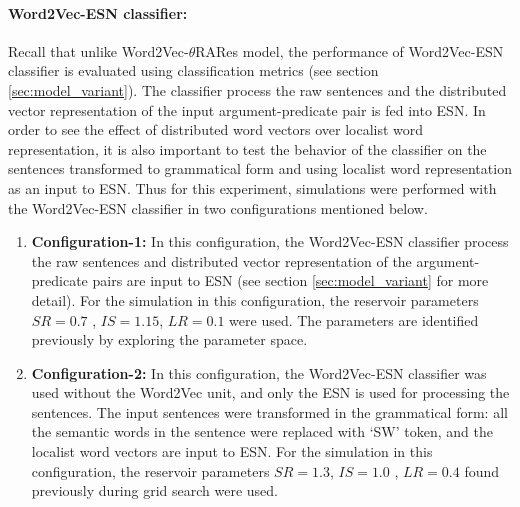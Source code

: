 \paragraph{Word2Vec-ESN classifier:} 

Recall that unlike Word2Vec-$\theta$RARes model, the performance of Word2Vec-ESN classifier is evaluated using classification metrics (see section \ref{sec:model_variant}). The classifier process the raw sentences and the distributed vector representation of the input argument-predicate pair is fed into ESN. In order to see the effect of distributed word vectors over localist word representation, it is also important to test the behavior of the classifier on the sentences transformed to grammatical form and using localist word representation as an input to ESN. Thus for this experiment, simulations were performed with the Word2Vec-ESN classifier in two configurations mentioned below.

\begin{enumerate}
\setlength{\itemsep}{\smallskipamount}

\item \textbf{Configuration-1: } In this configuration, the Word2Vec-ESN classifier process the raw sentences and distributed vector representation of the argument-predicate pairs are input to ESN (see section \ref{sec:model_variant} for more detail). For the simulation in this configuration, the reservoir parameters $SR = 0.7$ , $IS = 1.15$, $LR = 0.1$ were used. The parameters are identified previously by exploring the parameter space. \label{config-1}

\item \textbf{Configuration-2: } In this configuration, the Word2Vec-ESN classifier was used without the Word2Vec unit, and only the ESN is used for processing the sentences. The input sentences were transformed in the grammatical form: all the semantic words in the sentence were replaced with `SW' token, and the localist word vectors are input to ESN. For the simulation in this configuration, the reservoir parameters $SR = 1.3$, $IS = 1.0$ , $LR = 0.4$ found previously during grid search were used. \label{config-2}

\end{enumerate} 

